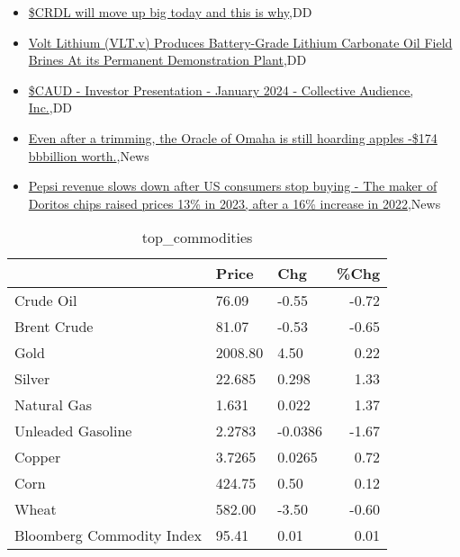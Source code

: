\documentclass{article}%
\begin{document}
%
\begin{itemize}%
\item%
\href{https://reddit.com/r/wallstreetbets/comments/1ardxu4/crdl\_will\_move\_up\_big\_today\_and\_this\_is\_why/}{\$CRDL will move up big today and this is why},DD%
\item%
\href{https://reddit.com/r/Baystreetbets/comments/1ar0ky9/volt\_lithium\_vltv\_produces\_batterygrade\_lithium/}{Volt Lithium (VLT.v) Produces Battery-Grade Lithium Carbonate Oil Field Brines At its Permanent Demonstration Plant},DD%
\item%
\href{https://reddit.com/r/Baystreetbets/comments/1aqq0k3/caud\_investor\_presentation\_january\_2024/}{\$CAUD - Investor Presentation - January 2024 - Collective Audience, Inc.},DD%
\item%
\href{https://reddit.com/r/StockMarket/comments/1ar49dc/even\_after\_a\_trimming\_the\_oracle\_of\_omaha\_is/}{Even after a trimming, the Oracle of Omaha is still hoarding apples -\$174 bbbillion worth.},News%
\item%
\href{https://reddit.com/r/Economics/comments/1ardcwu/pepsi\_revenue\_slows\_down\_after\_us\_consumers\_stop/}{Pepsi revenue slows down after US consumers stop buying - The maker of Doritos chips raised prices 13\% in 2023, after a 16\% increase in 2022},News%
\end{itemize}%


\begin{table}[htbp]%
\caption{top\_commodities}%
\centering%
\begin{adjustbox}{width=1\textwidth}%
\begin{tabular}{lllr}
\toprule
                          &   Price &     Chg &  \%Chg \\
\midrule
               Crude Oil  &   76.09 &   -0.55 & -0.72 \\
             Brent Crude  &   81.07 &   -0.53 & -0.65 \\
                    Gold  & 2008.80 &    4.50 &  0.22 \\
                  Silver  &  22.685 &   0.298 &  1.33 \\
             Natural Gas  &   1.631 &   0.022 &  1.37 \\
       Unleaded Gasoline  &  2.2783 & -0.0386 & -1.67 \\
                  Copper  &  3.7265 &  0.0265 &  0.72 \\
                    Corn  &  424.75 &    0.50 &  0.12 \\
                   Wheat  &  582.00 &   -3.50 & -0.60 \\
Bloomberg Commodity Index &   95.41 &    0.01 &  0.01 \\
\bottomrule
\end{tabular}
%
\end{adjustbox}%
\end{table}
\end{document}
